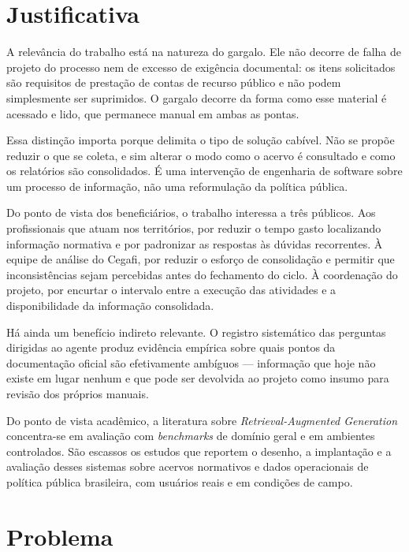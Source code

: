 \FloatBarrier
\section{Justificativa}
\label{sec:introducao-justificativa}

A relevância do trabalho está na natureza do gargalo. Ele não decorre de falha
de projeto do processo nem de excesso de exigência documental: os itens
solicitados são requisitos de prestação de contas de recurso público e não podem
simplesmente ser suprimidos. O gargalo decorre da forma como esse material é
acessado e lido, que permanece manual em ambas as pontas.

Essa distinção importa porque delimita o tipo de solução cabível. Não se propõe
reduzir o que se coleta, e sim alterar o modo como o acervo é consultado e como
os relatórios são consolidados. É uma intervenção de engenharia de software
sobre um processo de informação, não uma reformulação da política pública.

Do ponto de vista dos beneficiários, o trabalho interessa a três públicos. Aos
profissionais que atuam nos territórios, por reduzir o tempo gasto localizando
informação normativa e por padronizar as respostas às dúvidas recorrentes. À
equipe de análise do Cegafi, por reduzir o esforço de consolidação e permitir que
inconsistências sejam percebidas antes do fechamento do ciclo. À coordenação do
projeto, por encurtar o intervalo entre a execução das atividades e a
disponibilidade da informação consolidada.

Há ainda um benefício indireto relevante. O registro sistemático das perguntas
dirigidas ao agente produz evidência empírica sobre quais pontos da documentação
oficial são efetivamente ambíguos --- informação que hoje não existe em lugar
nenhum e que pode ser devolvida ao projeto como insumo para revisão dos próprios
manuais.

Do ponto de vista acadêmico, a literatura sobre \textit{Retrieval-Augmented
Generation} concentra-se em avaliação com \textit{benchmarks} de domínio geral
e em ambientes controlados. São escassos os estudos que reportem o desenho, a
implantação e a avaliação desses sistemas sobre acervos normativos e dados
operacionais de política pública brasileira, com usuários reais e em condições
de campo.

\section{Problema}
\label{sec:introducao-problema}

